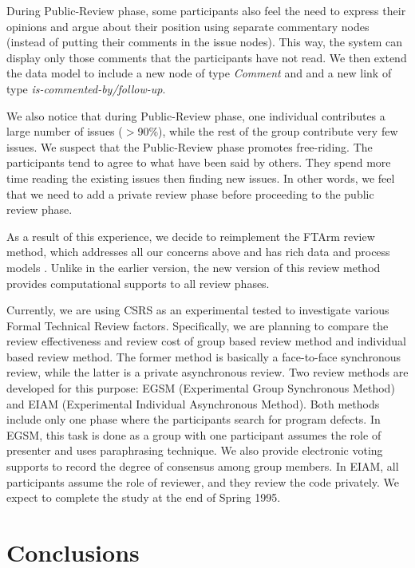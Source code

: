 During Public-Review phase, some participants also feel the need to
express their opinions and argue about their 
position using separate commentary nodes (instead of putting their
comments in the issue nodes). This way, the system can display only
those comments that the participants have not read.
We then extend the data model to include a new node of type {\it
Comment} and  and a new link of type {\it is-commented-by/follow-up}. 


We also notice that during Public-Review phase, one
individual contributes a large number of issues ($>$90\%), while the
rest of the group contribute very few issues. We suspect that the
Public-Review phase promotes free-riding. The participants tend to
agree to what have been said by others. They spend more time reading
the existing issues then finding new issues. In other words, we feel
that we need to add a private review phase before proceeding to the
public review phase. 

As a result of this experience, we decide to reimplement the FTArm
review method, which addresses all our concerns above and
has rich data and process models
\cite{Johnson93,CSDL-93-17}. Unlike in the earlier version, the new
version of this review method provides computational supports to all
review phases. 

Currently, we are using CSRS as an experimental tested to investigate
various Formal Technical Review factors. 
Specifically, we are planning to compare the review effectiveness and
review cost of group based review method and individual based review
method. The former method is basically a face-to-face synchronous
review, while the latter is a private asynchronous review.
Two review methods are developed for this purpose: EGSM (Experimental
Group Synchronous Method) and EIAM (Experimental Individual
Asynchronous Method). Both methods include only one phase where the 
participants search for program defects. In EGSM, this task is done as
a group with one participant assumes the role of presenter and uses
paraphrasing technique.  
We also provide electronic voting supports to record the degree of
consensus among group members. In EIAM, all participants assume the
role of reviewer, and they review the code privately.  
We expect to complete the study at the end of Spring 1995.



\section{Conclusions}

